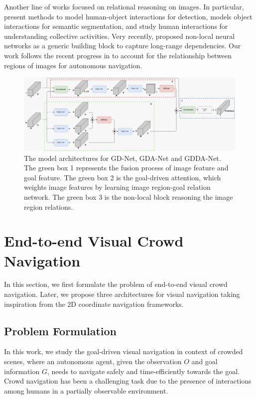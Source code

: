 \documentclass[10pt,twocolumn,letterpaper]{article}
\begin{document}
Another line of works focused on relational reasoning on images. In particular, \cite{yao_modeling_2010, yao_grouplet:_2010} present methods to model human-object interactions for detection, \cite{wang_learning_2017} models object interactions for semantic segmentation, and \cite{patron-perez_structured_2012,hoai_talking_2014} study human interactions for understanding collective activities. Very recently, \cite{wang_non-local_2017} proposed non-local neural networks as a generic building block to capture long-range dependencies. Our work follows the recent progress in \cite{wang_non-local_2017} to account for the relationship between regions of images for autonomous navigation. 


\begin{figure}[ht]\label{fig:model}
  \centering
  \includegraphics[width=\textwidth]{figures/model.jpg}
  \caption{The model architectures for GD-Net, GDA-Net and GDDA-Net. The green box 1 represents the fusion process of image feature and goal feature. The green box 2 is the goal-driven attention, which weights image features by learning image region-goal relation network. The green box 3 is the non-local block reasoning the image region relations.}
\end{figure}


\section{End-to-end Visual Crowd Navigation}
In this section, we first formulate the problem of end-to-end visual crowd navigation. Later, we propose  three architectures for visual navigation taking inspiration from the 2D coordinate navigation frameworks.
 
\subsection{Problem Formulation}
In this work, we study the goal-driven visual navigation in context of crowded scenes, where an autonomous agent, given the observation $O$ and goal information $G$, needs to navigate safely and time-efficiently towards the goal.  Crowd navigation has been a challenging task due to the presence of interactions among humans in a  partially observable environment. 
\end{document}
